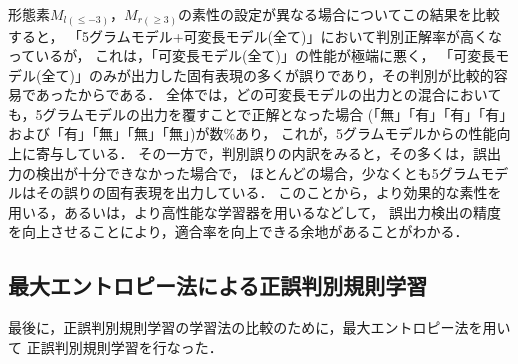 形態素$M_{l(\leq -3)}$，$M_{r(\geq 3)}$の素性の設定が異なる場合についてこの結果を比較すると，
「5グラムモデル+可変長モデル(全て)」において判別正解率が高くなっているが，
これは，「可変長モデル(全て)」の性能が極端に悪く，
「可変長モデル(全て)」のみが出力した固有表現の多くが誤りであり，その判別が比較的容易であったからである．
全体では，どの可変長モデルの出力との混合においても，5グラムモデルの出力を覆すことで正解となった場合
(「無」「有」「有」「有」および「有」「無」「無」「無」)が数\%あり，
これが，5グラムモデルからの性能向上に寄与している．
その一方で，判別誤りの内訳をみると，その多くは，誤出力の検出が十分できなかった場合で，
ほとんどの場合，少なくとも5グラムモデルはその誤りの固有表現を出力している．
このことから，より効果的な素性を用いる，あるいは，より高性能な学習器を用いるなどして，
誤出力検出の精度を向上させることにより，適合率を向上できる余地があることがわかる．

\subsection{最大エントロピー法による正誤判別規則学習}
\label{subsec:comb-ME}

最後に，正誤判別規則学習の学習法の比較のために，最大エントロピー法を用いて
正誤判別規則学習を行なった．

